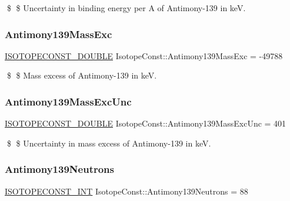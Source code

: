 \$ \$ Uncertainty in binding energy per A of Antimony-\/139 in keV. \mbox{\label{group___isotope_const-_antimony-_sb139_ga00c49517a9ecb87e27e5c1419b45150e}} 
\subsubsection{\texorpdfstring{Antimony139\+Mass\+Exc}{Antimony139MassExc}}
{\footnotesize\ttfamily \mbox{\hyperlink{group___isotope_const-_macros_ga8f45a7272ce02c0b4c65c44636ed719a}{I\+S\+O\+T\+O\+P\+E\+C\+O\+N\+S\+T\+\_\+\+D\+O\+U\+B\+LE}} Isotope\+Const\+::\+Antimony139\+Mass\+Exc = -\/49788}

\$ \$ Mass excess of Antimony-\/139 in keV. \mbox{\label{group___isotope_const-_antimony-_sb139_gae28c3b2c3f0a7f8a5e2cc591e5a43d80}} 
\subsubsection{\texorpdfstring{Antimony139\+Mass\+Exc\+Unc}{Antimony139MassExcUnc}}
{\footnotesize\ttfamily \mbox{\hyperlink{group___isotope_const-_macros_ga8f45a7272ce02c0b4c65c44636ed719a}{I\+S\+O\+T\+O\+P\+E\+C\+O\+N\+S\+T\+\_\+\+D\+O\+U\+B\+LE}} Isotope\+Const\+::\+Antimony139\+Mass\+Exc\+Unc = 401}

\$ \$ Uncertainty in mass excess of Antimony-\/139 in keV. \mbox{\label{group___isotope_const-_antimony-_sb139_gab56b7d326cbc484b24e72d33b318b416}} 
\subsubsection{\texorpdfstring{Antimony139\+Neutrons}{Antimony139Neutrons}}
{\footnotesize\ttfamily \mbox{\hyperlink{group___isotope_const-_macros_ga5f18360b3e99483a35c32d789e62621c}{I\+S\+O\+T\+O\+P\+E\+C\+O\+N\+S\+T\+\_\+\+I\+NT}} Isotope\+Const\+::\+Antimony139\+Neutrons = 88}

